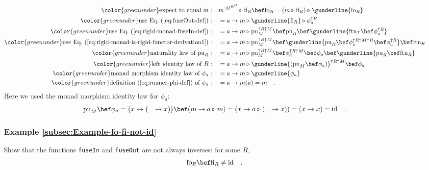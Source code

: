 \begin{align*}
{\color{greenunder}\text{expect to equal }m:}\quad & m^{:M^{R^{B}}}\triangleright\text{fi}_{R}\bef\text{fo}_{R}=\left(m\triangleright\text{fi}_{R}\right)\triangleright\gunderline{\text{fo}_{R}}\\
{\color{greenunder}\text{use Eq.~(\ref{eq:fuseOut-def})}:}\quad & =a\rightarrow m\triangleright\gunderline{\text{fi}_{R}}\triangleright\phi_{a}^{\uparrow R}\\
{\color{greenunder}\text{use Eq.~(\ref{eq:rigid-monad-fuseIn-def})}:}\quad & =a\rightarrow m\triangleright\text{pu}_{M}^{\uparrow R\uparrow M}\bef\text{pu}_{R}\bef\gunderline{\text{ftn}_{T}\bef\phi_{a}^{\uparrow R}}\\
{\color{greenunder}\text{use Eq.~(\ref{eq:rigid-monad-is-rigid-functor-derivation1})}:}\quad & =a\rightarrow m\triangleright\text{pu}_{M}^{\uparrow R\uparrow M}\bef\gunderline{\text{pu}_{R}\bef\phi_{a}^{\uparrow R\uparrow M\uparrow R}\bef\phi_{a}^{\uparrow R}}\bef\text{ftn}_{R}\\
{\color{greenunder}\text{naturality law of }\text{pu}_{R}:}\quad & =a\rightarrow m\triangleright\text{pu}_{M}^{\uparrow R\uparrow M}\bef\phi_{a}^{\uparrow R\uparrow M}\bef\phi_{a}\bef\gunderline{\text{pu}_{R}\bef\text{ftn}_{R}}\\
{\color{greenunder}\text{left identity law of }R:}\quad & =a\rightarrow m\triangleright\gunderline{(\text{pu}_{M}\bef\phi_{a})}^{\uparrow R\uparrow M}\bef\phi_{a}\\
{\color{greenunder}\text{monad morphism identity law of }\phi_{a}:}\quad & =a\rightarrow m\triangleright\gunderline{\phi_{a}}\\
{\color{greenunder}\text{definition~(\ref{eq:runner-phi-def}) of }\phi_{a}:}\quad & =a\rightarrow m(a)=m\quad.
\end{align*}
Here we used the monad morphism identity law for $\phi_{a}$:
\[
\text{pu}_{M}\bef\phi_{a}=\big(x\rightarrow(\_\rightarrow x)\big)\bef(m\rightarrow a\triangleright m)=\left(x\rightarrow a\triangleright(\_\rightarrow x)\right)=\left(x\rightarrow x\right)=\text{id}\quad.
\]


\subsubsection{Example \label{subsec:Example-fo-fi-not-id}\ref{subsec:Example-fo-fi-not-id}}

Show that the functions \lstinline!fuseIn! and \lstinline!fuseOut!
are not always inverses: for some $R$,
\[
\text{fo}_{R}\bef\text{fi}_{R}\neq\text{id}\quad.
\]



